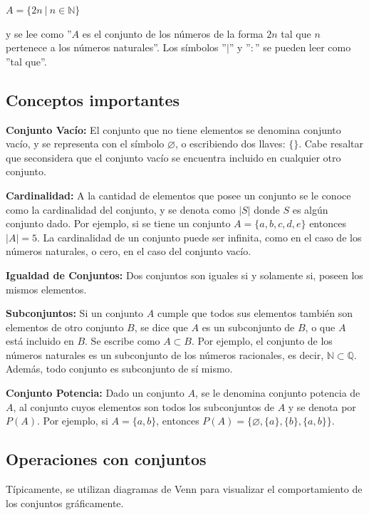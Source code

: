 \documentclass[12pt]{article}
\begin{document}
\begin{center}
    $A=\{2n \ | \ n \in \mathbb{N} \}$
\end{center}

y se lee como ''$A$ es el conjunto de los números de la forma $2n$ tal que $n$ pertenece a los números naturales''. Los símbolos ''$|$'' y ''$:$'' se pueden leer como ''tal que''.

\subsection{Conceptos importantes}

\textbf{Conjunto Vacío:} El conjunto que no tiene  elementos se denomina conjunto vacío, y se representa con el símbolo $\varnothing$, o escribiendo dos llaves: $\{\}$. Cabe resaltar que seconsidera que el conjunto vacío se encuentra incluido en cualquier otro conjunto.

\textbf{Cardinalidad:} A la cantidad de elementos que posee un conjunto se le conoce como la cardinalidad del conjunto, y se denota como $|S|$ donde $S$ es algún conjunto dado. Por ejemplo, si se tiene un conjunto $A=\{a, b, c, d, e\}$ entonces $|A|= 5$. La cardinalidad de un conjunto puede ser infinita, como en el caso de los números naturales, o cero, en el caso del conjunto vacío.

\textbf{Igualdad de Conjuntos:} Dos conjuntos son iguales si y solamente si, poseen los mismos elementos.

\textbf{Subconjuntos:} Si un conjunto $A$ cumple que todos sus elementos también son elementos de otro conjunto $B$, se dice que $A$ es un subconjunto de $B$, o que $A$ está incluido en $B$. Se escribe como $A \subset B$.  Por ejemplo, el conjunto de los números naturales es un subconjunto de los números racionales, es decir, $\mathbb{N} \subset \mathbb{Q}$. Además, todo conjunto es subconjunto de sí mismo.

\textbf{Conjunto Potencia:} Dado un conjunto $A$, se le denomina conjunto potencia de $A$, al conjunto cuyos elementos son todos los subconjuntos de $A$ y se denota por $P(A)$. Por ejemplo, si $A=\{a,b\}$, entonces $P(A)=\{\varnothing,\{a\},\{b\},\{a,b\}\}$.

\subsection{Operaciones con conjuntos}

Típicamente, se utilizan diagramas de Venn para visualizar el comportamiento de los conjuntos gráficamente.
\end{document}
